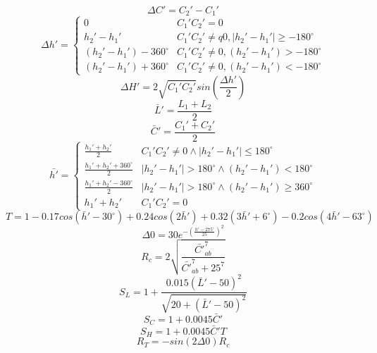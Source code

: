 \begin{equation}
\Delta C'=C_{2}'-C_{1}'
\end{equation}
\begin{equation}
\Delta h' =
\begin{cases}
0 & C_{1}'C_{2}'=0\\
h_{2}'-h_{1}' & C_{1}'C_{2}'\ne q0, |h_{2}'-h_{1}'| \geq -180^{\circ}\\
(h_{2}'-h_{1}')-360^{\circ} & C_{1}'C_{2}'\neq 0, (h_{2}'-h_{1}') > -180^{\circ}\\
(h_{2}'-h_{1}')+360^{\circ} & C_{1}'C_{2}'\neq 0, (h_{2}'-h_{1}') < -180^{\circ}
\end{cases}
\end{equation}
\begin{equation}
\Delta H'=2\sqrt{C_{1}'C_{2}'}sin(\frac{\Delta h'}{2})
\end{equation}
\begin{equation}
\bar{L}'=\frac{L_{1}+L_{2}}{2}
\end{equation}
\begin{equation}
\bar{C}'=\frac{C_{1}'+C_{2}'}{2}
\end{equation}
\begin{equation}
\bar{h'} =
\begin{cases}
\frac{h_{1}'+h_{2}'}{2} & C_{1}'C_{2}'\neq 0 \wedge |h_{2}'-h_{1}'| \leq 180^{\circ}\\
\frac{h_{1}'+h_{2}'+360^{\circ}}{2}& |h_{2}'-h_{1}'| > 180^{\circ} \wedge (h_{2}'-h_{1}') < 180^{\circ}\\
\frac{h_{1}'+h_{2}'-360^{\circ}}{2} & |h_{2}'-h_{1}'| > 180^{\circ} \wedge (h_{2}'-h_{1}') \geq 360^{\circ}\\
h_{1}'+h_{2}' & C_{1}'C_{2}'=0
\end{cases}
\end{equation}
\begin{equation}
T=1-0.17 cos(\bar{h}'-30^{\circ})+0.24 cos(2\bar{h}')+0.32(3\bar{h}'+6^{\circ})-0.2 cos(4\bar{h}'-63^{\circ})
\end{equation}
\begin{equation}
\Delta 0 = 30e^{-(\frac{h'-275^{\circ}}{25})^{2}}
\end{equation}
\begin{equation}
R_{c}=2\sqrt{\frac{\bar{C'}_{ab}^{7}}{\bar{C'}_{ab}^{7}+25^{7}}}
\end{equation}
\begin{equation}
S_{L}=1+\frac{0.015(\bar{L}'-50)^{2}}{\sqrt{20+(\bar{L}'-50)^{2}}}
\end{equation}
\begin{equation}
S_{C}=1+0.0045\bar{C}'
\end{equation}
\begin{equation}
S_{H}=1+0.0045\bar{C}'T
\end{equation}
\begin{equation}
R_{T}=-sin(2 \Delta 0)R_{c}
\end{equation}